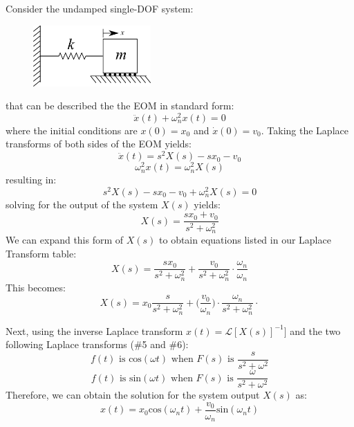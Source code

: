 \documentclass[12pt,a4paper]{article}
\newcommand{\Laplace}[1]{\ensuremath{\mathcal{L}{\left[#1\right]}}}
\begin{document}
Consider the undamped single-DOF system:
\begin{figure}[H]
	\centering
	\includegraphics[width=0.4\textwidth]{../../Figures/1-DOF-mass_horizontal.png}
\end{figure}
that can be described the the EOM in standard form:
\begin{equation}
	\ddot{x}(t) + \omega_n^2x(t) = 0 
\end{equation}
where the initial conditions are $x(0)=x_0$ and $\dot{x}(0) = v_0$. Taking the Laplace transforms of both sides of the EOM yields:
\begin{equation}
	\ddot{x}(t)  = s^2X(s) -sx_0 -v_0
\end{equation}
\begin{equation}
	\omega_n^2x(t) = \omega_n^2X(s)
\end{equation}
resulting in:
\begin{equation}
	s^2X(s) -sx_0 -v_0 + \omega_n^2X(s) = 0
\end{equation}
solving for the output of the system $X(s)$ yields:
\begin{equation}
X(s) = \frac{sx_0 + v_0}{s^2 + \omega_n^2}
\end{equation}
We can expand this form of $X(s)$ to obtain equations listed in our Laplace Transform table:
\begin{equation}
X(s) = \frac{sx_0}{s^2 + \omega_n^2} + \frac{v_0}{s^2 + \omega_n^2}\cdot \frac{\omega_n}{\omega_n}
\end{equation}
This becomes:
\begin{equation}
X(s) = x_0\frac{s}{s^2 + \omega_n^2} + \bigg(\frac{v_0}{\omega_n}\bigg) \cdot \frac{\omega_n}{s^2 + \omega_n^2}\cdot 
\end{equation}

Next, using the inverse Laplace transform $x(t) = \Laplace{X(s)}^{-1}]$ and the two following Laplace transforms (\#5 and \#6):
\begin{equation}
f(t) \text{ is cos}(\omega t) \text{ when }  F(s) \text{ is } \frac{s}{s^2+\omega^2} 
\end{equation}
\begin{equation}
f(t) \text{ is sin}(\omega t)  \text{ when }  F(s) \text{ is } \frac{\omega}{s^2+\omega^2} 
\end{equation}
Therefore, we can obtain the solution for the system output $X(s)$ as:
\begin{equation}
x(t) = x_0 \text{cos}(\omega_n t) + \frac{v_0}{\omega_n}\text{sin}(\omega_n t)
\end{equation}
\end{document}
